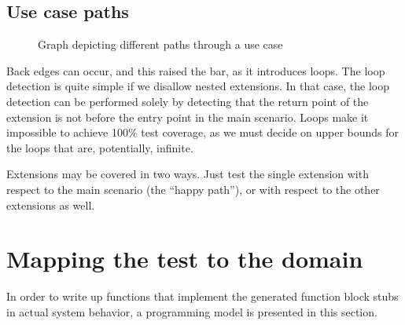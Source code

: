 \subsection{Use case paths}
\label{ssec:use-case-paths}
\begin{figure}[!htbp]
\centering
{}
\caption{Graph depicting different paths through a use case}
\label{fig:application graphs}
\end{figure}
Back edges can occur, and this raised the bar, as it introduces loops. The loop detection is quite simple if we disallow nested extensions. In that case, the loop detection can be performed solely by detecting that the return point of the extension is not before the entry point in the main scenario. Loops make it impossible to achieve 100\% test coverage, as we must decide on upper bounds for the loops that are, potentially, infinite.

Extensions may be covered in two ways. Just test the single extension with respect to the main scenario (the ``happy path''), or with respect to the other extensions as well.



\section{Mapping the test to the domain}
In order to write up functions that implement the generated function block stubs in actual system behavior, a programming model is presented in this section.

